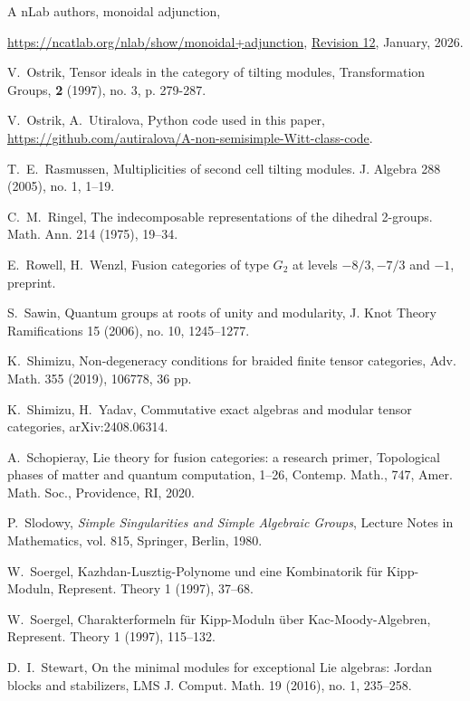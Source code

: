 \documentclass{amsart}
\theoremstyle{definition}
\numberwithin{equation}{section}
\begin{document}
\begin{thebibliography}{A}
 nLab authors,
  monoidal adjunction,
  
 {\url{https://ncatlab.org/nlab/show/monoidal+adjunction}},
 {\href{https://ncatlab.org/nlab/revision/monoidal+adjunction/12}{Revision 12}}, January, 2026.


 V.~Ostrik, Tensor ideals in the category of tilting modules,
Transformation Groups, {\bf 2} (1997), no. 3, p. 279-287.

 V.~Ostrik, A.~Utiralova, Python code used in this paper,
{\url{https://github.com/autiralova/A-non-semisimple-Witt-class-code}}.

 T.~E.~Rasmussen, Multiplicities of second cell tilting modules. J. Algebra 288 (2005), no. 1, 1--19.

 C.~M.~Ringel, The indecomposable representations of the dihedral 2-groups. Math. Ann. 214 (1975), 19--34.

 E.~Rowell, H.~Wenzl, Fusion categories of type $G_2$ at levels $-8/3,-7/3$ and $-1$, preprint.

 S.~Sawin, Quantum groups at roots of unity and modularity, J. Knot Theory Ramifications 15 (2006), no. 10, 1245--1277.

 K.~Shimizu, Non-degeneracy conditions for braided finite tensor categories, Adv. Math. 355 (2019), 106778, 36 pp.

 K.~Shimizu, H.~Yadav, Commutative exact algebras and modular tensor categories, arXiv:2408.06314. 

 A.~Schopieray, Lie theory for fusion categories: a research primer, Topological phases of matter and quantum computation, 1--26, Contemp. Math., 747, Amer. Math. Soc., Providence, RI, 2020.

 P.~Slodowy, {\em Simple Singularities and Simple Algebraic Groups}, Lecture Notes in Mathematics, vol. 815, Springer, Berlin, 1980.

 W.~Soergel, Kazhdan-Lusztig-Polynome und eine Kombinatorik f\"ur Kipp-Moduln, 
Represent. Theory 1 (1997), 37--68.

 W.~Soergel, Charakterformeln f\"ur Kipp-Moduln \"uber Kac-Moody-Algebren, 
Represent. Theory 1 (1997), 115--132.

 D.~I.~Stewart, On the minimal modules for exceptional Lie algebras: Jordan blocks and stabilizers, LMS J. Comput. Math. 19 (2016), no. 1, 235--258.

\end{thebibliography}
\end{document}
